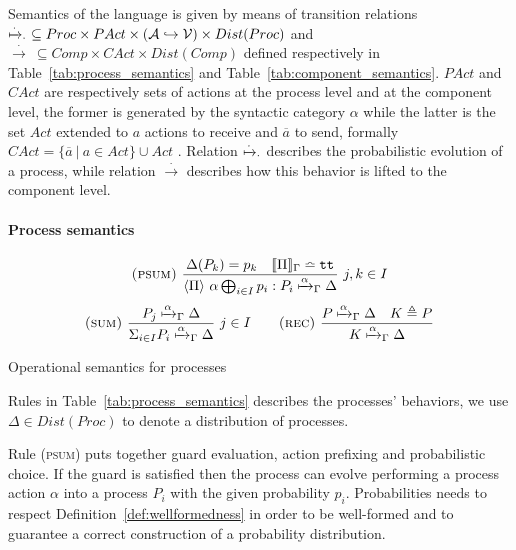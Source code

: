 \documentclass{article}
\theoremstyle{remark}
\begin{document}
Semantics of the language is given by means of transition relations $\xmapsto{\cdot}_{\cdot}\ \subseteq Proc \times PAct \times (\mathcal{A} \hookrightarrow \mathcal{V}) \times Dist(Proc)$ and $\xrightarrow{\cdot}\ \subseteq Comp \times CAct \times Dist(Comp)$ defined respectively in Table~\ref{tab:process_semantics} and Table~\ref{tab:component_semantics}. $PAct$ and $CAct$ are respectively sets of actions at the process level and at the component level, the former is generated by the syntactic category $\alpha$ while the latter is the set $Act$ extended to $a$ actions to receive and $\overline{a}$ to send, formally $CAct = \{\overline{a}\ |\ a \in Act\} \cup Act$ . Relation $\xmapsto{\cdot}_{\cdot}$ describes the probabilistic evolution of a process, while relation $\xrightarrow{\cdot}$ describes how this behavior is lifted to the component level. 

\paragraph{Process semantics} %
\label{par:process_semantics}
\begin{table}[htbp]
	\begin{center}
		$$ \textsc{(psum)}\ \frac{\Delta(P_k) = p_k \quad \llbracket \Pi \rrbracket_\Gamma \bumpeq \texttt{tt}}{\langle \Pi \rangle\ \alpha \bigoplus_{i \in I} p_i : P_i \xmapsto{\alpha}_\Gamma \Delta}\ j,k \in I $$
		$$ \textsc{(sum)}\ \frac{ P_j \xmapsto{\alpha}_\Gamma \Delta}{ \Sigma_{i \in I} P_i \xmapsto{\alpha}_\Gamma \Delta }\ j \in I \qquad \textsc{(rec)}\ \frac{ P \xmapsto{\alpha}_\Gamma \Delta \quad K \triangleq P}{ K \xmapsto{\alpha}_\Gamma \Delta } $$
	\end{center}
	\caption{Operational semantics for processes}
	\label{tab:process_semantics}
\end{table}
%
Rules in Table~\ref{tab:process_semantics} describes the processes' behaviors, we use $\Delta \in Dist(Proc)$ to denote a distribution of processes.

Rule \textsc{(psum)} puts together guard evaluation, action prefixing and probabilistic choice. If the guard is satisfied then the process can evolve performing a process action $\alpha$ into a process $P_i$ with the given probability $p_i$. Probabilities needs to respect Definition~\ref{def:wellformedness} in order to be well-formed and to guarantee a correct construction of a probability distribution.
\end{document}
